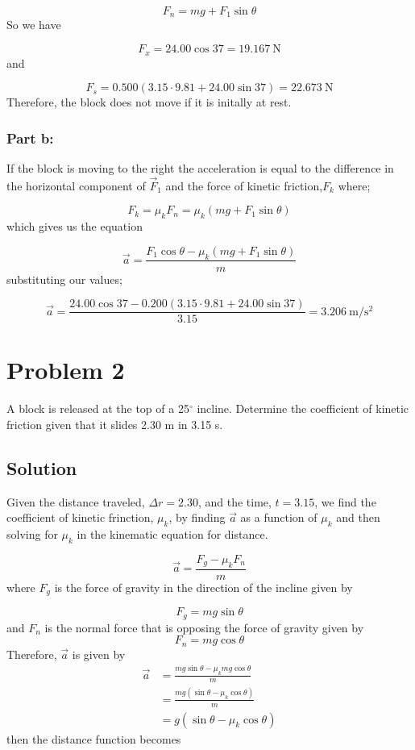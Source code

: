 \documentclass{article}
\begin{document}
\[
	F_n = mg + F_1 \sin \theta
\]
So we have

\[
	F_x  = 24.00 \cos 37 = \boxed{19.167\ \text{N}}
\]
and

\[
	F_s = 0.500\left( 3.15 \cdot 9.81 + 24.00 \sin 37 \right) = \boxed{22.673\ \text{N}}
\]
Therefore, the block does not move if it is initally at rest.

\subsubsection*{Part b:}
If the block is moving to the right the acceleration is equal to the difference in the horizontal component of $\vec{F}_1$ and the force of kinetic friction,$F_k$ where;

\[
	F_k = \mu_k F_n = \mu_k \left( mg + F_1 \sin \theta \right)
\]
which gives us the equation

\[
	\vec{a} = \frac{F_1 \cos \theta - \mu_k \left( mg + F_1 \sin \theta \right)}{m}
\]
substituting our values;

\[
	\vec{a} = \frac{24.00 \cos 37 - 0.200\left(3.15 \cdot 9.81 + 24.00 \sin 37 \right)}{3.15} = \boxed{3.206\ \text{m}/\text{s}^2}
\]

\section*{Problem 2}
A block is released at the top of a 25$^\circ$ incline. Determine the coefficient of kinetic friction
given that it slides 2.30 m in 3.15 s.

\subsection*{Solution}
Given the distance traveled, $\Delta r = 2.30$, and the time, $t = 3.15$, we find the coefficient of kinetic frinction, $\mu_k$, by finding $\vec{a}$ as a function of $\mu_k$ and then solving for $\mu_k$ in the kinematic equation for distance.

\[
	\vec{a} = \frac{F_g - \mu_k F_n}{m}
\]
where $F_g$ is the force of gravity in the direction of the incline given by

\[
	F_g = mg \sin \theta
\]
and $F_n$ is the normal force that is opposing the force of gravity given by
\[
	F_n = mg \cos \theta
\]
Therefore, $\vec{a}$ is given by
\begin{align*}
	\vec{a} &= \frac{mg \sin \theta - \mu_k mg \cos \theta}{m} \\
		&= \frac{mg \left( \sin \theta - \mu_k\cos \theta \right)}{m} \\
		&= g\left( \sin \theta  - \mu_k \cos \theta \right)
\end{align*}
then the distance function becomes
\end{document}
